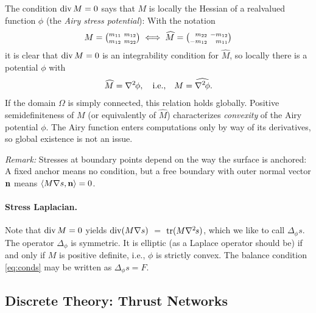 \documentclass[review]{acmsiggraph}
\def\<{\mathchoice{\big\langle}{\langle}{\langle}{\langle}}
\def\>{\mathchoice{\big\rangle}{\rangle}{\rangle}{\rangle}}
\def\wh{\widehat}
\def\Div{\mathop{{\rm div}}\nolimits}
\def\tr{\mathop{{\rm tr}}\nolimits}
\def\ess{s}
\def\Hess#1{{\def\testess{#1}\nabla^2\ifx\testess\ess\!s\else #1\fi}}
\def\Hess#1{\text{$\nabla^2\hskip-.2ex #1$}}
\begin{document}
The condition $\Div M=0$ says that $M$ is locally the Hessian of a
real\dash valued function $\phi$ (the {\em Airy stress potential}): With
the notation
	\begin{align*}
	M =
	{\textstyle {m_{11} \ m_{12} \choose m_{12} \ m_{22}}}
	\iff	
	\wh M =
	{\textstyle {\hphantom{-}m_{22} \ -m_{12} \choose -m_{12}
		 \ \hphantom{-}m_{11}}}
	\end{align*}
 it is clear that $\Div M=0$ is an integrability condition for $\wh M$, so
locally there is a potential $\phi$ with
	\begin{align*}
	\wh M = \Hess\phi, \quad \text{i.e.,}\quad
	M = \wh{\Hess\phi}.
	\end{align*}
 If the domain $\Omega$ is simply connected, this relation holds globally.
Positive semidefiniteness of $M$ (or equivalently of $\wh M$)
characterizes {\em convexity} of the Airy potential $\phi$. The Airy
function enters computations only by way of its derivatives, so global
existence is not an issue.

{\it Remark:} Stresses at boundary points depend on the way the surface is
anchored: A fixed anchor means no condition, but a free boundary with
outer normal vector ${\mathbf n}$ means $\<M \nabla s, \nw \> = 0$.


\paragraph{Stress Laplacian.} Note that $\Div M =0$ yields $\Div(M\nabla
s)$ $ =$ $ \tr(M\Hess s)$, which we like to call $\Delta_\phi s$. The
operator $\Delta_\phi$ is symmetric. It is elliptic (as a Laplace operator
should be) if and only if $M$ is positive definite, i.e., $\phi$ is
strictly convex. The balance condition \eqref{eq:conds} may be written as
	$
	\Delta_\phi s = F.
	$


\subsection{Discrete Theory: Thrust Networks}
\label{sec:thrustnetworks}
\end{document}
